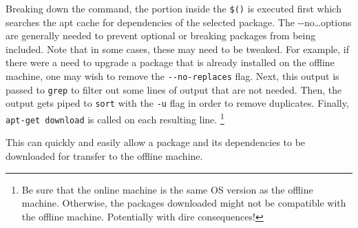 Breaking down the command, the portion inside the \texttt{\$()} is executed first which searches the apt cache for dependencies of the selected package. The -\phantom{}-no\ldots options are generally needed to prevent optional or breaking packages from being included. Note that in some cases, these may need to be tweaked. For example, if there were a need to upgrade a package that is already installed on the offline machine, one may wish to remove the \texttt{-\phantom{}-no-replaces} flag. Next, this output is passed to \texttt{grep} to filter out some lines of output that are not needed. Then, the output gets piped to \texttt{sort} with the \texttt{-u} flag in order to remove duplicates. Finally, \texttt{apt-get download} is called on each resulting line.
\footnote{Be sure that the online machine is the same OS version as the offline machine. Otherwise, the packages downloaded might not be compatible with the offline machine. Potentially with dire consequences!}

This can quickly and easily allow a package and its dependencies to be downloaded for transfer to the offline machine.
